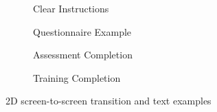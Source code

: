 \documentclass[manuscript]{./Models/acmart}
\begin{document}
\begin{figure}[ht]
\begin{subfigure}[b]{0.3\textwidth}
        \caption{Clear Instructions}
        \label{fig:subim3}
    \end{subfigure}
    \begin{subfigure}[b]{0.3\textwidth}
        \centering
        \caption{Questionnaire Example}
        \label{fig:subim4}
    \end{subfigure}
    \hfill
    \begin{subfigure}[b]{0.3\textwidth}
        \caption{Assessment Completion}
        \label{fig:subim5}
    \end{subfigure}
    \hfill
    \begin{subfigure}[b]{0.3\textwidth}
        \caption{Training Completion}
        \label{fig:subim6}
    \end{subfigure}
        \caption{2D screen-to-screen transition and text examples}
        \label{fig: second three screens}
\end{figure}
\end{document}
